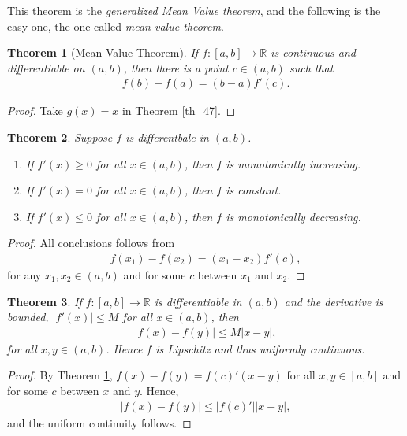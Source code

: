 \documentclass[10pt]{book}
\newtheorem{theorem}{Theorem}[chapter]
\theoremstyle{definition}
\numberwithin{equation}{chapter}
\begin{document}
\medskip

This theorem is the {\em generalized Mean Value theorem}, and the following is the easy one, the one called {\em mean value theorem}.

\medskip

\begin{theorem}[Mean Value Theorem]\label{th_48}
If $f: [a,b] \to \mathbb{R}$ is continuous and differentiable on $(a,b)$, then there is a point $c \in (a,b)$ such that
\begin{align*}
    f(b) - f(a) = (b - a) f'(c).
\end{align*}
\end{theorem}
\begin{proof}
Take $g(x) = x$ in Theorem \ref{th_47}.
\end{proof}

\medskip

\begin{theorem}
Suppose $f$ is differentbale in $(a,b)$.
\begin{enumerate}[label=(\alph*)]
    \item If $f'(x) \geq 0$ for all $x \in (a,b)$, then $f$ is monotonically increasing.
    
    \item If $f'(x) = 0$ for all $x \in (a,b)$, then $f$ is constant.
    
    \item If $f'(x) \leq 0$ for all $x \in (a,b)$, then $f$ is monotonically decreasing.
\end{enumerate}
\end{theorem}
\begin{proof}
All conclusions follows from
\begin{align*}
    f(x_1) - f(x_2) = (x_1 - x_2) f'(c),
\end{align*}
for any $x_1, x_2 \in (a,b)$ and for some $c$ between $x_1$ and $x_2$.
\end{proof}

\medskip

\begin{theorem}
If $f: [a,b] \to \mathbb{R}$ is differentiable in $(a,b)$ and the derivative is bounded, $\left|f'(x)\right| \leq M$ for all $x \in (a,b)$, then 
\begin{align*}
    \left|f(x) - f(y)\right| \leq M \left|x - y\right|,
\end{align*}
for all $x,y \in (a,b)$. Hence $f$ is Lipschitz and thus uniformly continuous.
\end{theorem}
\begin{proof}
By Theorem \ref{th_48}, $f(x) - f(y) = f(c)'(x - y)$ for all $x,y \in [a,b]$ and for some $c$ between $x$ and $y$. Hence,
\begin{align*}
    \left|f(x) - f(y)\right| \leq \left|f(c)'\right| \left|x - y\right|,
\end{align*}
and the uniform continuity follows.
\end{proof}
\end{document}
